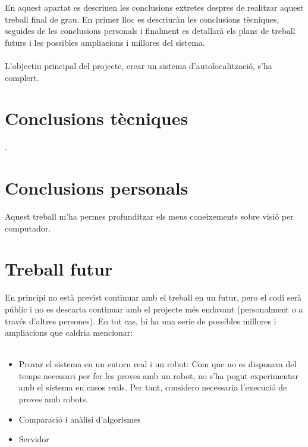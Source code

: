 En aquest apartat es descriuen les conclusions extretes despres de realitzar aquest treball final de grau. En primer lloc es descriuràn les conclusions tècniques, seguides de les conclusions personals
i finalment es detallarà els plans de treball futurs i les possibles ampliacions i millores del sistema.\\\\
L'objectiu principal del projecte, crear un sistema d'autolocalització, s'ha complert.

\section{Conclusions tècniques}
	.
\section{Conclusions personals}
	Aquest treball m'ha permes profunditzar els meus coneixements sobre visió per computador.
\section{Treball futur}
	En principi no està previst continuar amb el treball en un futur, pero el codi serà públic i no es descarta continuar amb el projecte més endavant (personalment o a través d'altres persones). En tot cas,
	hi ha una serie de possibles millores i ampliacions que caldria mencionar:\\\\
	
	\begin{itemize}
		\item{Provar el sistema en un entorn real i un robot: Com que no es disposava del temps necessari per fer les proves amb un robot, no s'ha pogut experimentar amb el sistema en casos reals. Per tant,
		considero necessaria l'execució de proves amb robots.}
		\item{Comparació i anàlisi d'algorismes}
		\item{Servidor}
	\end{itemize}
